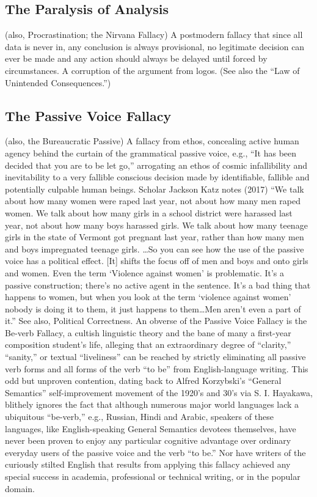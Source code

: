 \documentclass[10pt,a4paper,british]{article}
\begin{document}
\begin{multicols}{2}
    \subsection{The Paralysis of Analysis} (also, Procrastination; the Nirvana Fallacy) A postmodern fallacy that since all data is never in, any conclusion is always provisional, no legitimate decision can ever be made and any action should always be delayed until forced by circumstances. A corruption of the argument from logos. (See also the ``Law of Unintended Consequences.'') 

    \subsection{The Passive Voice Fallacy} (also, the Bureaucratic Passive) A fallacy from ethos, concealing active human agency behind the curtain of the grammatical passive voice, e.g., ``It has been decided that you are to be let go,'' arrogating an ethos of cosmic infallibility and inevitability to a very fallible conscious decision made by identifiable, fallible and potentially culpable human beings. Scholar Jackson Katz notes (2017) ``We talk about how many women were raped last year, not about how many men raped women. We talk about how many girls in a school district were harassed last year, not about how many boys harassed girls. We talk about how many teenage girls in the state of Vermont got pregnant last year, rather than how many men and boys impregnated teenage girls. \ldots  So you can see how the use of the passive voice has a political effect. [It] shifts the focus off of men and boys and onto girls and women. Even the term `Violence against women' is problematic. It's a passive construction; there's no active agent in the sentence. It's a bad thing that happens to women, but when you look at the term `violence against women' nobody is doing it to them, it just happens to them\ldots Men aren't even a part of it.''  See also, Political Correctness. An obverse of the Passive Voice Fallacy is the Be{-}verb Fallacy, a cultish linguistic theory and the bane of many a first{-}year composition student's life, alleging that an extraordinary degree of ``clarity,'' ``sanity,'' or textual ``liveliness'' can be reached by strictly eliminating all passive verb forms and all forms of the verb ``to be'' from English{-}language writing. This odd but unproven contention, dating back to Alfred Korzybski's ``General Semantics'' self{-}improvement movement of the 1920's and 30's via S. I.  Hayakawa, blithely ignores the fact that although numerous major world languages lack a ubiquitous ``be{-}verb,'' e.g., Russian, Hindi and Arabic, speakers of these languages, like English{-}speaking General Semantics devotees themselves, have never been proven to enjoy any particular cognitive advantage over ordinary everyday users of the passive voice and the verb ``to be.'' Nor have writers of the curiously stilted English that results from applying this fallacy achieved any special success in academia, professional or technical writing, or in the popular domain.  


\end{multicols}
\end{document}
